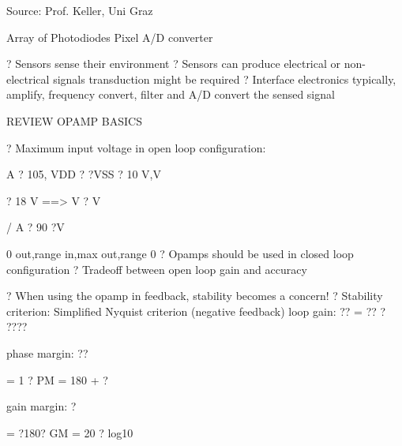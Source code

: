 \documentclass[2pt,landscape]{article}
\begin{document}
\begin{multicols*}{5}
Source: Prof. Keller, Uni 
Graz











Array of Photodiodes	Pixel A/D converter





?	Sensors sense their environment
?	Sensors can produce electrical or non-electrical signals 
transduction might be required
?	Interface electronics typically, amplify, frequency convert, filter and A/D
convert the sensed signal

























REVIEW
OPAMP BASICS







?	Maximum input voltage in open loop configuration:



A ? 105, VDD ? ?VSS ? 10 V,V


? 18 V ==> V	? V


/ A ? 90 ?V  


0	out,range	in,max	out,range	0
?	Opamps should be used in closed loop configuration
?	Tradeoff between open loop gain and accuracy





?	When using the opamp in feedback, stability becomes a concern!
?	Stability criterion: Simplified Nyquist criterion (negative feedback)
loop gain: ??	= ?? ? ????



phase margin: ??


= 1 ? PM = 180\textbullet 
+ ?






gain margin: ?


= ?180\textbullet ? 
GM = 20 ? 
log10






\end{multicols*}
\end{document}
